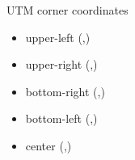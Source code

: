 \documentclass[c]{beamer}
\begin{document}
\begin{frame}
\begin{columns}
\begin{column}{0.30\textwidth}
\begin{block}{\scriptsize UTM corner coordinates}
{\scriptsize
 \begin{itemize}
  \item upper-left (,)\\
  \item upper-right (,)\\
  \item bottom-right (,)\\
  \item bottom-left (,)\\
  \item center (,)\\
 \end{itemize}
}
\end{block}
\end{column}
\end{columns}

\end{frame}
\end{document}
